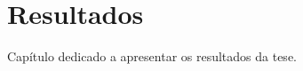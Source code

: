 \chapter{Resultados}
\label{chapter:resultados}
Capítulo dedicado a apresentar os resultados da tese.

% 





